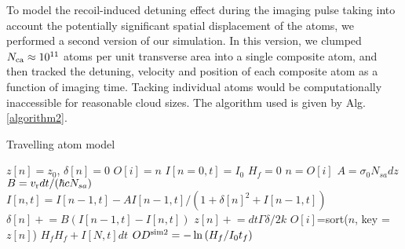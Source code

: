 To model the recoil-induced detuning effect during the imaging pulse taking into account the potentially significant spatial displacement of the atoms, we performed a second version of our simulation. In this version, we clumped $N_{\rm{ca}}\approx10^{11}$ atoms per unit transverse area into a single composite atom, and then tracked the detuning, velocity and position of each composite atom as a function of imaging time. Tacking individual atoms would be computationally inaccessible for reasonable cloud sizes. The algorithm used is given by Alg. \ref{algorithm2}.

%
\begin{algorithm}
\caption{Travelling atom model}
\label{algorithm2}
\begin{algorithmic}
\STATE $z[n]=z_0$, $\delta[n]=0$ 
\STATE $O[i]=n$ 
\STATE $I[n=0,t]=I_0$ 
\STATE $H_f=0$ 
\STATE $n=O[i]$ 
 \STATE $A=\sigma_0 N_{sa} dz$ 
 \STATE $B=v_{\rm{r}} dt/(\hbar c  N_{sa})$  
\STATE $I[n,t]=I[n-1,t] - A I[n-1,t]/(1+\delta[n]^2+I[n-1,t])$  
\STATE $\delta[n]\mathrel{+}=B\left(I[n-1,t]-I[n,t]\right)$  
\STATE $z[n]\mathrel{+}=dt\Gamma\delta/2k$ 
\ENDFOR
\STATE $O[i]$=sort($n$, key =$z[n]$) 
\STATE $H_f H_f+ I[N,t]dt$ 
\ENDFOR
\STATE $OD^{\rm{sim2}}=-\ln{(H_f/I_0t_f)}$
\end{algorithmic}
\end{algorithm}

